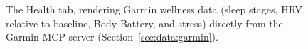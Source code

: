 \begin{figure}[ht]
\centering
{}
\caption[Health tab]{The Health tab, rendering Garmin wellness data (sleep stages, HRV relative to baseline, Body Battery, and stress) directly from the Garmin MCP server (Section~\ref{sec:data:garmin}).}\label{fig:screenshot_health}
\end{figure}
